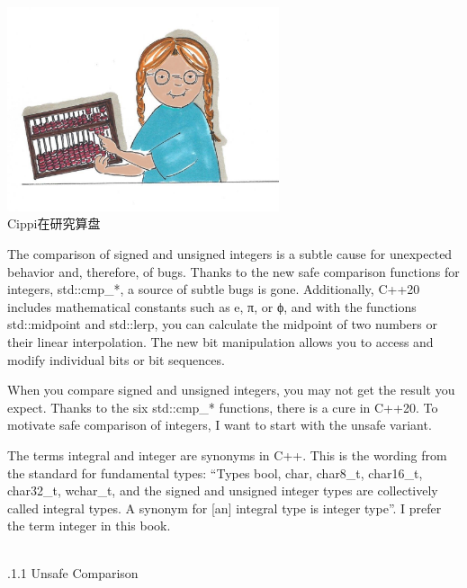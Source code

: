 \begin{center}
\includegraphics[width=0.6\textwidth]{content/3/chapter5/images/15.png}\\
Cippi在研究算盘
\end{center}

The comparison of signed and unsigned integers is a subtle cause for unexpected behavior and, therefore, of bugs. Thanks to the new safe comparison functions for integers, std::cmp\_*, a source of subtle bugs is gone. Additionally, C++20 includes mathematical constants such as e, π, or ϕ, and with the functions std::midpoint and std::lerp, you can calculate the midpoint of two numbers or their linear interpolation. The new bit manipulation allows you to access and modify individual bits or bit sequences.


When you compare signed and unsigned integers, you may not get the result you expect. Thanks to the six std::cmp\_* functions, there is a cure in C++20. To motivate safe comparison of integers, I want to start with the unsafe variant.

\begin{tcolorbox}[breakable,enhanced jigsaw,colback=blue!5!white,colframe=blue!75!black,title={Integral versus Integer}]
	
The terms integral and integer are synonyms in C++. This is the wording from the standard for fundamental types: “Types bool, char, char8\_t, char16\_t, char32\_t, wchar\_t, and the signed and unsigned integer types are collectively called integral types. A synonym for [an] integral type is integer type”. I prefer the term integer in this book.
	
\end{tcolorbox}

\hspace*{\fill} \\ %
.1.1\hspace{0.2cm} Unsafe Comparison


